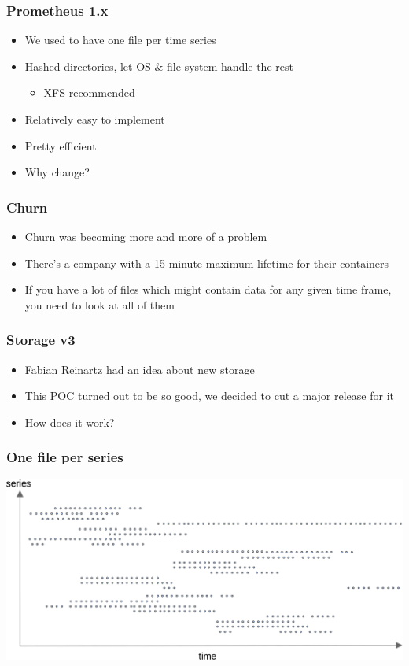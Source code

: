 \documentclass[t]{beamer}
\begin{document}
\begin{frame}
	\frametitle{Prometheus 1.x}
	\begin{itemize}
		\item We used to have one file per time series
		\item Hashed directories, let OS \& file system handle the rest
		\begin{itemize}
			\item XFS recommended
		\end{itemize}
		\item Relatively easy to implement
		\item Pretty efficient
		\item Why change?
	\end{itemize}
\end{frame}

\begin{frame}
	\frametitle{Churn}
	\begin{itemize}
		\item Churn was becoming more and more of a problem
		\item There's a company with a 15 minute maximum lifetime for their containers
		\item If you have a lot of files which might contain data for any given time frame, you need to look at all of them
	\end{itemize}
\end{frame}

\begin{frame}
	\frametitle{Storage v3}
	\begin{itemize}
		\item Fabian Reinartz had an idea about new storage
		\item This POC turned out to be so good, we decided to cut a major release for it
		\item How does it work?
	\end{itemize}
\end{frame}

\begin{frame}
	\frametitle{One file per series}
	\includegraphics[width=\textwidth]{storage--file_per_series.png}
\end{frame}
\end{document}
